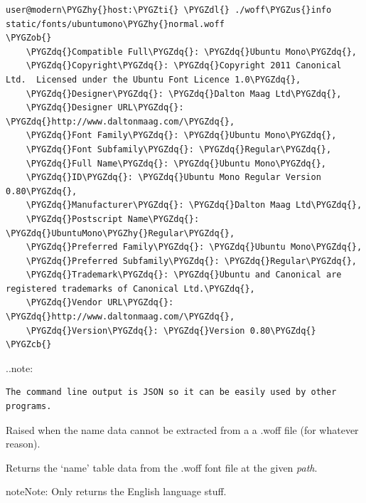 \documentclass[letterpaper,10pt,openany]{sphinxmanual}
\def\PYGZus{\char`\_}
\def\PYGZob{\char`\{}
\def\PYGZcb{\char`\}}
\def\PYGZdl{\char`\$}
\def\PYGZhy{\char`\-}
\def\PYGZdq{\char`\"}
\def\PYGZti{\char`\~}
\begin{document}
\begin{Verbatim}[commandchars=\\\{\}]
user@modern\PYGZhy{}host:\PYGZti{} \PYGZdl{} ./woff\PYGZus{}info static/fonts/ubuntumono\PYGZhy{}normal.woff
\PYGZob{}
    \PYGZdq{}Compatible Full\PYGZdq{}: \PYGZdq{}Ubuntu Mono\PYGZdq{},
    \PYGZdq{}Copyright\PYGZdq{}: \PYGZdq{}Copyright 2011 Canonical Ltd.  Licensed under the Ubuntu Font Licence 1.0\PYGZdq{},
    \PYGZdq{}Designer\PYGZdq{}: \PYGZdq{}Dalton Maag Ltd\PYGZdq{},
    \PYGZdq{}Designer URL\PYGZdq{}: \PYGZdq{}http://www.daltonmaag.com/\PYGZdq{},
    \PYGZdq{}Font Family\PYGZdq{}: \PYGZdq{}Ubuntu Mono\PYGZdq{},
    \PYGZdq{}Font Subfamily\PYGZdq{}: \PYGZdq{}Regular\PYGZdq{},
    \PYGZdq{}Full Name\PYGZdq{}: \PYGZdq{}Ubuntu Mono\PYGZdq{},
    \PYGZdq{}ID\PYGZdq{}: \PYGZdq{}Ubuntu Mono Regular Version 0.80\PYGZdq{},
    \PYGZdq{}Manufacturer\PYGZdq{}: \PYGZdq{}Dalton Maag Ltd\PYGZdq{},
    \PYGZdq{}Postscript Name\PYGZdq{}: \PYGZdq{}UbuntuMono\PYGZhy{}Regular\PYGZdq{},
    \PYGZdq{}Preferred Family\PYGZdq{}: \PYGZdq{}Ubuntu Mono\PYGZdq{},
    \PYGZdq{}Preferred Subfamily\PYGZdq{}: \PYGZdq{}Regular\PYGZdq{},
    \PYGZdq{}Trademark\PYGZdq{}: \PYGZdq{}Ubuntu and Canonical are registered trademarks of Canonical Ltd.\PYGZdq{},
    \PYGZdq{}Vendor URL\PYGZdq{}: \PYGZdq{}http://www.daltonmaag.com/\PYGZdq{},
    \PYGZdq{}Version\PYGZdq{}: \PYGZdq{}Version 0.80\PYGZdq{}
\PYGZcb{}
\end{Verbatim}

..note:

\begin{Verbatim}[commandchars=\\\{\}]
The command line output is JSON so it can be easily used by other programs.
\end{Verbatim}

\begin{fulllineitems}
\label{Applications/terminal/woff_info:woff_info.BadWoff}
Raised when the name data cannot be extracted from a a .woff file (for
whatever reason).

\end{fulllineitems}


\begin{fulllineitems}
\label{Applications/terminal/woff_info:woff_info.woff_name_data}
Returns the `name' table data from the .woff font file at the given \emph{path}.

\begin{notice}{note}{Note:}
Only returns the English language stuff.
\end{notice}

\end{fulllineitems}
\end{document}

